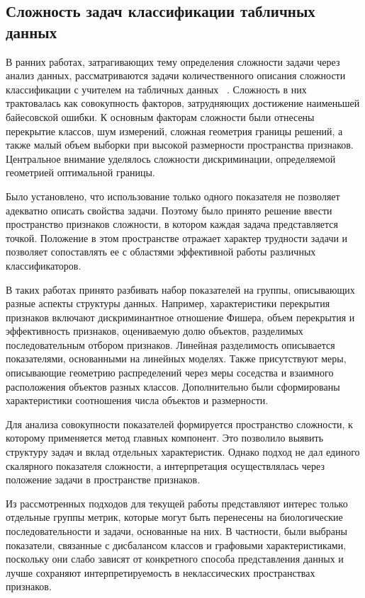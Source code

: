 \documentclass[specification,annotation,times]{itmo-student-thesis}
\begin{document}
\subsection{Сложность задач классификации табличных данных}

В ранних работах, затрагивающих тему определения сложности задачи через анализ данных, рассматриваются задачи количественного описания сложности классификации с учителем на табличных данных  ~\cite{990132, 10.1145/3347711}. Сложность в них трактовалась как совокупность факторов, затрудняющих достижение наименьшей байесовской ошибки. К основным факторам сложности были отнесены перекрытие классов, шум измерений, сложная геометрия границы решений, а также малый объем выборки при высокой размерности пространства признаков. Центральное внимание уделялось сложности дискриминации, определяемой геометрией оптимальной границы.

Было установлено, что использование только одного показателя не позволяет адекватно описать свойства задачи. Поэтому было принято решение ввести пространство признаков сложности, в котором каждая задача представляется точкой. Положение в этом пространстве отражает характер трудности задачи и позволяет сопоставлять ее с областями эффективной работы различных классификаторов. 

В таких работах принято разбивать набор показателей на группы, описывающих разные аспекты структуры данных. Например, характеристики перекрытия признаков включают дискриминантное отношение Фишера, объем перекрытия и эффективность признаков, оцениваемую долю объектов, разделимых последовательным отбором признаков. Линейная разделимость описывается показателями, основанными на линейных моделях. Также присутствуют меры, описывающие геометрию распределений через меры соседства и взаимного расположения объектов разных классов. 
Дополнительно были сформированы характеристики соотношения числа объектов и размерности. 

Для анализа совокупности показателей формируется пространство сложности, к которому применяется метод главных компонент. Это позволило выявить структуру задач и вклад отдельных характеристик. Однако подход не дал единого скалярного показателя сложности, а интерпретация осуществлялась через положение задачи в пространстве признаков.

Из рассмотренных подходов для текущей работы представляют интерес только отдельные группы метрик, которые могут быть перенесены на биологические последовательности и задачи, основанные на них. В частности, были выбраны показатели, связанные с дисбалансом классов и графовыми характеристиками, поскольку они слабо зависят от конкретного способа представления данных и лучше сохраняют интерпретируемость в неклассических пространствах признаков.
\end{document}
